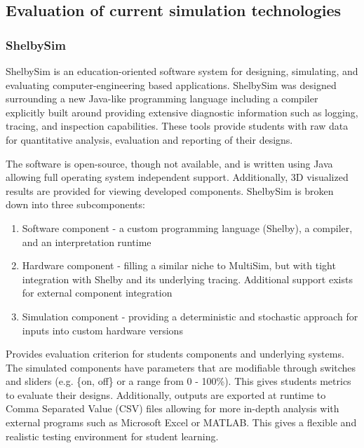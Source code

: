 \subsection{Evaluation of current simulation technologies} 



\subsubsection{ShelbySim}

\cite{Tappan2009}

ShelbySim is an education-oriented software system for designing, simulating, and evaluating computer-engineering based applications. ShelbySim was designed surrounding a new Java-like programming language including a compiler explicitly built around providing extensive diagnostic information such as logging, tracing, and inspection capabilities. These tools provide students with raw data for quantitative analysis, evaluation and reporting of their designs. 

The software is open-source, though not available, and is written using Java allowing full operating system independent support. Additionally, 3D visualized results are provided for viewing developed components. ShelbySim is broken down into three subcomponents:
\begin{enumerate}
\item Software component - a custom programming language (Shelby), a compiler, and an interpretation runtime
\item Hardware component - filling a similar niche to MultiSim, but with tight integration with Shelby and its underlying tracing. Additional support exists for external component integration
\item Simulation component - providing a deterministic and stochastic approach for inputs into custom hardware versions
\end{enumerate} 

Provides evaluation criterion for students components and underlying systems. The simulated components have parameters that are modifiable through switches and sliders (e.g. \{on, off\} or a range from 0 - 100\%). This gives students metrics to evaluate their designs. Additionally, outputs are exported at runtime to Comma Separated Value (CSV) files allowing for more in-depth analysis with external programs such as Microsoft Excel or MATLAB. This gives a flexible and realistic testing environment for student learning. 

